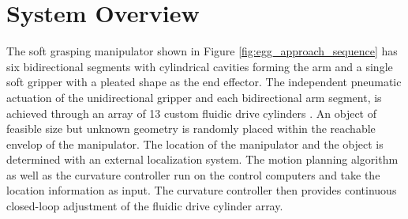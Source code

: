 \section{System Overview}
The soft grasping manipulator shown in Figure \ref{fig:egg_approach_sequence} has six bidirectional segments with cylindrical cavities forming the arm and a single soft gripper with a pleated shape as the end effector. 
The independent pneumatic actuation of the unidirectional gripper and each bidirectional arm segment, is achieved through an array of 13 custom fluidic drive cylinders \cite{marchese2014design}.
An object of feasible size but unknown geometry is randomly placed within the reachable envelop of the manipulator.  
The location of the manipulator and the object is determined with an external localization system. 
The motion planning algorithm as well as the curvature controller run on the control computers and take the location information as input.
The curvature controller then provides continuous closed-loop adjustment of the fluidic drive cylinder array.




